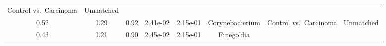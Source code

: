 \documentclass[12pt,]{article}
\begin{document}
\begin{longtable}[]{@{}cccccccc@{}}
\begin{minipage}[t]{0.14\columnwidth}
Control vs.~Carcinoma\strut
\end{minipage} & \begin{minipage}[t]{0.09\columnwidth}\centering\strut
Unmatched\strut
\end{minipage}\tabularnewline
\begin{minipage}[t]{0.05\columnwidth}\centering\strut
0.52\strut
\end{minipage} & \begin{minipage}[t]{0.09\columnwidth}\centering\strut
0.29\strut
\end{minipage} & \begin{minipage}[t]{0.09\columnwidth}\centering\strut
0.92\strut
\end{minipage} & \begin{minipage}[t]{0.07\columnwidth}\centering\strut
2.41e-02\strut
\end{minipage} & \begin{minipage}[t]{0.07\columnwidth}\centering\strut
2.15e-01\strut
\end{minipage} & \begin{minipage}[t]{0.20\columnwidth}\centering\strut
Corynebacterium\strut
\end{minipage} & \begin{minipage}[t]{0.14\columnwidth}\centering\strut
Control vs.~Carcinoma\strut
\end{minipage} & \begin{minipage}[t]{0.09\columnwidth}\centering\strut
Unmatched\strut
\end{minipage}\tabularnewline
\begin{minipage}[t]{0.05\columnwidth}\centering\strut
0.43\strut
\end{minipage} & \begin{minipage}[t]{0.09\columnwidth}\centering\strut
0.21\strut
\end{minipage} & \begin{minipage}[t]{0.09\columnwidth}\centering\strut
0.90\strut
\end{minipage} & \begin{minipage}[t]{0.07\columnwidth}\centering\strut
2.45e-02\strut
\end{minipage} & \begin{minipage}[t]{0.07\columnwidth}\centering\strut
2.15e-01\strut
\end{minipage} & \begin{minipage}[t]{0.20\columnwidth}\centering\strut
Finegoldia\strut
\end{minipage} & \begin{minipage}[t]{0.14\columnwidth}\centering\strut

\end{minipage}
\end{longtable}
\end{document}
